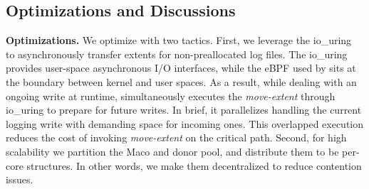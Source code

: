 \subsection{Optimizations and Discussions}\label{sec:design:discussion}
{\bf Optimizations.}
We   optimize \odes with two tactics.
First, %
we leverage the   io\_uring~\cite{iouring,ioctlWik84:online} to asynchronously transfer extents for non-preallocated log files. %
The io\_uring provides user-space asynchronous I/O interfaces, %
while
the eBPF used by \odes 
sits at the boundary between kernel and user spaces.
As a result,
while dealing with an ongoing   write at runtime,
\odes  simultaneously executes the {\it move-extent} through io\_uring to prepare for future writes.
In brief, it parallelizes handling
the current logging write with demanding space for   incoming ones.
This overlapped execution    reduces the cost of invoking   {\it move-extent}
on the critical path.
Second, for high scalability
we partition  the  Maco and donor pool, and distribute them to be per-core  structures. 
In other words, we make them decentralized to reduce contention issues.


